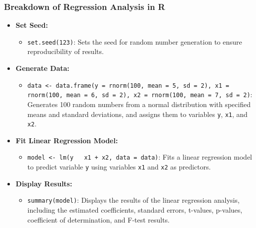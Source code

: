 \documentclass[serif, 9pt, aspectratio=32]{beamer}
\begin{document}
\begin{frame}
    \frametitle{Breakdown of Regression Analysis in R}
    \begin{itemize}
        \setlength{\itemsep}{2em}
        \item \textbf{Set Seed:}
              \begin{itemize}
                  \item \texttt{set.seed(123)}: Sets the seed for random number generation to ensure reproducibility of results.
              \end{itemize}

        \item \textbf{Generate Data:}
              \begin{itemize}
                  \item \texttt{data <- data.frame(y = rnorm(100, mean = 5, sd = 2), x1 = rnorm(100, mean = 6, sd = 2), x2 = rnorm(100, mean = 7, sd = 2)}: Generates 100 random numbers from a normal distribution with specified means and standard deviations, and assigns them to variables \texttt{y}, \texttt{x1}, and \texttt{x2}.
              \end{itemize}

        \item \textbf{Fit Linear Regression Model:}
              \begin{itemize}
                  \item \texttt{model <- lm(y ~ x1 + x2, data = data)}: Fits a linear regression model to predict variable \texttt{y} using variables \texttt{x1} and \texttt{x2} as predictors.
              \end{itemize}

        \item \textbf{Display Results:}
              \begin{itemize}
                  \item \texttt{summary(model)}: Displays the results of the linear regression analysis, including the estimated coefficients, standard errors, t-values, p-values, coefficient of determination, and F-test results.
              \end{itemize}
    \end{itemize}
\end{frame}
\end{document}
